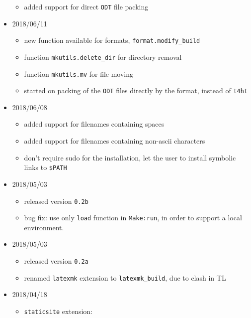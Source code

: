 \begin{itemize}
  \begin{itemize}
  \tightlist
  \item
    added support for direct \texttt{ODT} file packing
  \end{itemize}
\item
  2018/06/11

  \begin{itemize}
  \tightlist
  \item
    new function available for formats, \texttt{format.modify\_build}
  \item
    function \texttt{mkutils.delete\_dir} for directory removal
  \item
    function \texttt{mkutils.mv} for file moving
  \item
    started on packing of the \texttt{ODT} files directly by the format,
    instead of \texttt{t4ht}
  \end{itemize}
\item
  2018/06/08

  \begin{itemize}
  \tightlist
  \item
    added support for filenames containing spaces
  \item
    added support for filenames containing non-ascii characters
  \item
    don't require sudo for the installation, let the user to install
    symbolic links to \texttt{\$PATH}
  \end{itemize}
\item
  2018/05/03

  \begin{itemize}
  \tightlist
  \item
    released version \texttt{0.2b}
  \item
    bug fix: use only \texttt{load} function in \texttt{Make:run}, in
    order to support a local environment.
  \end{itemize}
\item
  2018/05/03

  \begin{itemize}
  \tightlist
  \item
    released version \texttt{0.2a}
  \item
    renamed \texttt{latexmk} extension to \texttt{latexmk\_build}, due
    to clash in TL
  \end{itemize}
\item
  2018/04/18

  \begin{itemize}
  \tightlist
  \item
    \texttt{staticsite} extension:


\end{itemize}
\end{itemize}
